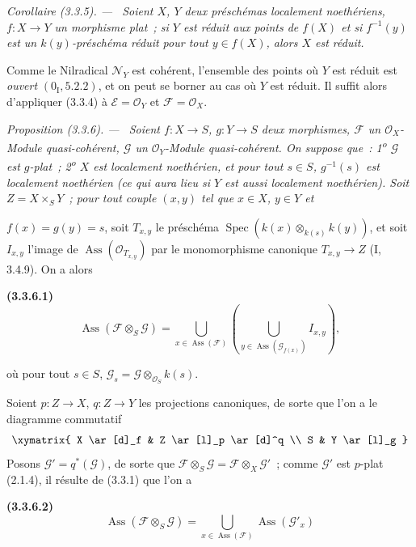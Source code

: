 \documentclass[10pt,oneside]{book}
\newcommand{\oldpage}[2][]{%
  \setcounter{footnote}{0}%
  \marginpar{\scriptsize\textbf{#1}~|~#2}\ignorespaces}
\newenvironment{env}[1][]{\par\medskip\noindent\textbf{(#1)}\ }{\par}
\newenvironment{proposition}[1][]{%
  \par\medskip\noindent\itshape Proposition (#1). ---\ }{\par}
\newenvironment{corollary}[1][]{%
  \par\medskip\noindent\itshape Corollaire (#1). ---\ }{\par}
\begin{document}
\begin{corollary}[3.3.5]
\label{IV.2.3.3.5-fr}
Soient $X$, $Y$ deux préschémas localement noethériens, $f:X\to Y$ un
morphisme plat~; si $Y$ est réduit aux points de $f(X)$ et si $f^{-1}(y)$ est
un $k(y)$-préschéma réduit pour tout $y\in f(X)$, alors $X$ est réduit.
\end{corollary}

Comme le Nilradical $\mathcal N_Y$ est cohérent, l'ensemble des points où $Y$
est réduit est \emph{ouvert} $(0_{\mathrm I},5.2.2)$, et on peut se borner au
cas où $Y$ est réduit. Il suffit alors d'appliquer (3.3.4) à
$\mathcal E=\mathcal O_Y$ et $\mathcal F=\mathcal O_X$.

\begin{proposition}[3.3.6]
\label{IV.2.3.3.6-fr}
Soient $f:X\to S$, $g:Y\to S$ deux morphismes, $\mathcal F$ un
$\mathcal O_X$-Module quasi-cohérent, $\mathcal G$ un $\mathcal O_Y$-Module
quasi-cohérent. On suppose que~: 1\textsuperscript{o} $\mathcal G$ est
$g$-plat~; 2\textsuperscript{o} $X$ est localement noethérien, et pour tout
$s\in S$, $g^{-1}(s)$ est localement noethérien (ce qui aura lieu si $Y$ est
aussi localement noethérien). Soit $Z=X\times_S Y$~; pour tout couple $(x,y)$
tel que $x\in X$, $y\in Y$ et

\oldpage[IV-2]{45}
$f(x)=g(y)=s$, soit $T_{x,y}$ le préschéma
$\operatorname{Spec}(k(x)\otimes_{k(s)}k(y))$, et soit $I_{x,y}$ l'image de
$\operatorname{Ass}(\mathcal O_{T_{x,y}})$ par le monomorphisme canonique
$T_{x,y}\to Z$ (I, 3.4.9). On a alors
\end{proposition}

\begin{env}[3.3.6.1]
\label{IV.2.3.3.6.1-fr}
\[
\operatorname{Ass}(\mathcal F\otimes_S\mathcal G)
=\bigcup_{x\in\operatorname{Ass}(\mathcal F)}
\left(\bigcup_{y\in\operatorname{Ass}(\mathcal G_{f(x)})}I_{x,y}\right),
\]
\end{env}

où pour tout $s\in S$, $\mathcal G_s=\mathcal G\otimes_{\mathcal O_S}k(s)$.

Soient $p:Z\to X$, $q:Z\to Y$ les projections canoniques, de sorte que l'on
a le diagramme commutatif
\[
\xymatrix{
X \ar[d]_f & Z \ar[l]_p \ar[d]^q \\
S & Y \ar[l]_g
}
\]
Posons $\mathcal G'=q^*(\mathcal G)$, de sorte que
$\mathcal F\otimes_S\mathcal G=\mathcal F\otimes_X\mathcal G'$~; comme
$\mathcal G'$ est $p$-plat (2.1.4), il résulte de (3.3.1) que l'on a

\begin{env}[3.3.6.2]
\label{IV.2.3.3.6.2-fr}
\[
\operatorname{Ass}(\mathcal F\otimes_S\mathcal G)
=\bigcup_{x\in\operatorname{Ass}(\mathcal F)}
\operatorname{Ass}(\mathcal G'_x)
\]
\end{env}
\end{document}
